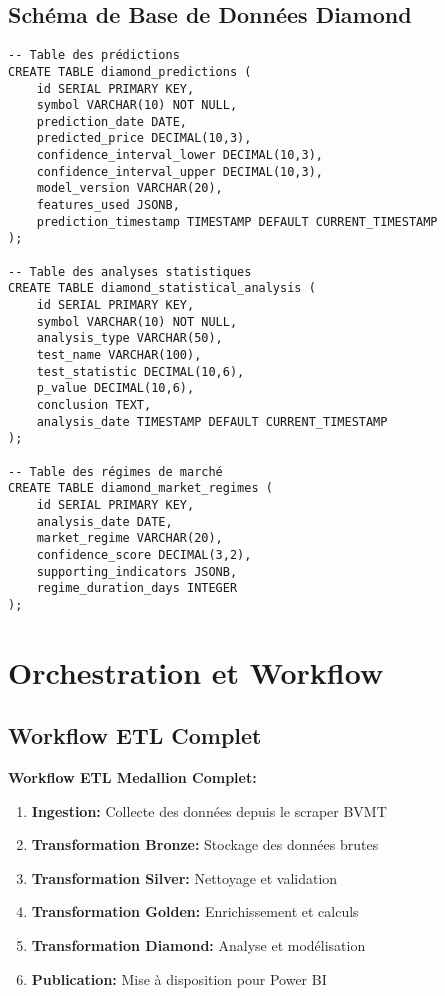 \subsection{Schéma de Base de Données Diamond}

\begin{verbatim}
-- Table des prédictions
CREATE TABLE diamond_predictions (
    id SERIAL PRIMARY KEY,
    symbol VARCHAR(10) NOT NULL,
    prediction_date DATE,
    predicted_price DECIMAL(10,3),
    confidence_interval_lower DECIMAL(10,3),
    confidence_interval_upper DECIMAL(10,3),
    model_version VARCHAR(20),
    features_used JSONB,
    prediction_timestamp TIMESTAMP DEFAULT CURRENT_TIMESTAMP
);

-- Table des analyses statistiques
CREATE TABLE diamond_statistical_analysis (
    id SERIAL PRIMARY KEY,
    symbol VARCHAR(10) NOT NULL,
    analysis_type VARCHAR(50),
    test_name VARCHAR(100),
    test_statistic DECIMAL(10,6),
    p_value DECIMAL(10,6),
    conclusion TEXT,
    analysis_date TIMESTAMP DEFAULT CURRENT_TIMESTAMP
);

-- Table des régimes de marché
CREATE TABLE diamond_market_regimes (
    id SERIAL PRIMARY KEY,
    analysis_date DATE,
    market_regime VARCHAR(20),
    confidence_score DECIMAL(3,2),
    supporting_indicators JSONB,
    regime_duration_days INTEGER
);
\end{verbatim}

\section{Orchestration et Workflow}

\subsection{Workflow ETL Complet}


\textbf{Workflow ETL Medallion Complet:}
\begin{enumerate}
    \item \textbf{Ingestion:} Collecte des données depuis le scraper BVMT
    \item \textbf{Transformation Bronze:} Stockage des données brutes
    \item \textbf{Transformation Silver:} Nettoyage et validation
    \item \textbf{Transformation Golden:} Enrichissement et calculs
    \item \textbf{Transformation Diamond:} Analyse et modélisation
    \item \textbf{Publication:} Mise à disposition pour Power BI
\end{enumerate}

